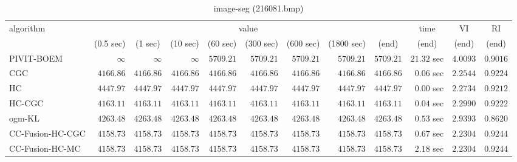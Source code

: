 \begin{table}[H]
\scriptsize
\centering
\caption{image-seg (216081.bmp)}
\label{tab:anytimetable-image-seg-216081.bmp}
\begin{tabular}{lrrrrrrrrrrr}
\toprule
           algorithm &                                   \multicolumn{8}{c}{value} & \multicolumn{1}{c}{time}    & \multicolumn{1}{c}{VI}  & \multicolumn{1}{c}{RI} \\  
\cmidrule(lr){2-9}\cmidrule(lr){10-10} \cmidrule(lr){11-11} \cmidrule(lr){12-12}   
                     & \multicolumn{1}{c}{(0.5 sec)} & \multicolumn{1}{c}{(1 sec)} & \multicolumn{1}{c}{(10 sec)} & \multicolumn{1}{c}{(60 sec)} & \multicolumn{1}{c}{(300 sec)} & \multicolumn{1}{c}{(600 sec)} & \multicolumn{1}{c}{(1800 sec)} & \multicolumn{1}{c}{(end)} & \multicolumn{1}{c}{(end)}    & \multicolumn{1}{c}{(end)}   & \multicolumn{1}{c}{(end)}  \\ \midrule 
          PIVIT-BOEM & $\infty$ & $\infty$ & $\infty$ & $      5709.21$ & $      5709.21$ & $      5709.21$ & $      5709.21$ & $      5709.21$ & $        21.32$ sec    & $       4.0093$  & $       0.9016$ \\ 
                 CGC & $      4166.86$ & $      4166.86$ & $      4166.86$ & $      4166.86$ & $      4166.86$ & $      4166.86$ & $      4166.86$ & $      4166.86$ & $         0.06$ sec    & $       2.2544$  & $       0.9224$ \\ 
                  HC & $      4447.97$ & $      4447.97$ & $      4447.97$ & $      4447.97$ & $      4447.97$ & $      4447.97$ & $      4447.97$ & $      4447.97$ & $         0.00$ sec    & $       2.2734$  & $       0.9212$ \\ 
              HC-CGC & $      4163.11$ & $      4163.11$ & $      4163.11$ & $      4163.11$ & $      4163.11$ & $      4163.11$ & $      4163.11$ & $      4163.11$ & $         0.04$ sec    & $       2.2990$  & $       0.9222$ \\ 
              ogm-KL & $      4263.48$ & $      4263.48$ & $      4263.48$ & $      4263.48$ & $      4263.48$ & $      4263.48$ & $      4263.48$ & $      4263.48$ & $         0.53$ sec    & $       2.9393$  & $       0.8620$ \\ 
    CC-Fusion-HC-CGC & $      4158.73$ & $      4158.73$ & $      4158.73$ & $      4158.73$ & $      4158.73$ & $      4158.73$ & $      4158.73$ & $      4158.73$ & $         0.67$ sec    & $       2.2304$  & $       0.9244$ \\ 
     CC-Fusion-HC-MC & $      4158.73$ & $      4158.73$ & $      4158.73$ & $      4158.73$ & $      4158.73$ & $      4158.73$ & $      4158.73$ & $      4158.73$ & $         2.18$ sec    & $       2.2304$  & $       0.9244$ \\ 

\end{tabular}
\end{table}
